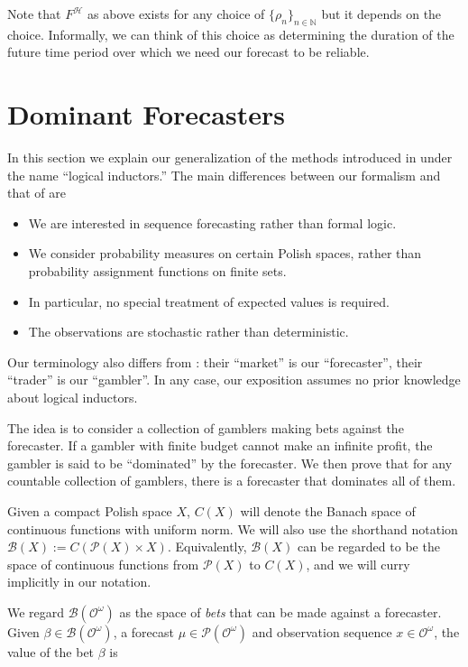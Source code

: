 \documentclass[11pt]{article}
\theoremstyle{definition}
\theoremstyle{plain}
\newcommand{\Nats}{\mathbb{N}}
\newcommand{\Sq}[2]{\{#1\}_{#2 \in \Nats}}
\newcommand{\Sqn}[1]{\Sq{#1}{n}}
\newcommand{\PM}{\mathcal{P}}
\newcommand{\Ob}{\mathcal{O}}
\newcommand{\OO}{\Ob^\omega}
\newcommand{\PMO}{\PM(\OO)}
\newcommand{\MC}{\mathcal{H}}
\newcommand{\Gm}{\mathcal{B}}
\newcommand{\GMO}{\Gm(\OO)}
\begin{document}
Note that $F^\MC$ as above exists for any choice of $\Sqn{\rho_n}$ but it depends on the choice. Informally, we can think of this choice as determining the duration of the future time period over which we need our forecast to be reliable.

\section{Dominant Forecasters}
\label{sec:garrabrant}

In this section we explain our generalization of the methods introduced in \cite{Garrabrant_2016} under the name \enquote{logical inductors.} The main differences between our formalism and that of \cite{Garrabrant_2016} are

\begin{itemize}
\item 
We are interested in sequence forecasting rather than formal logic.
\item
We consider probability measures on certain Polish spaces, rather than probability assignment functions on finite sets.
\item
In particular, no special treatment of expected values is required.
\item
The observations are stochastic rather than deterministic.
\end{itemize}

Our terminology also differs from \cite{Garrabrant_2016}: their \enquote{market} is our \enquote{forecaster}, their \enquote{trader} is our \enquote{gambler}. In any case, our exposition assumes no prior knowledge about logical inductors.

The idea is to consider a collection of gamblers making bets against the forecaster. If a gambler with finite budget cannot make an infinite profit, the gambler is said to be \enquote{dominated} by the forecaster. We then prove that for any countable collection of gamblers, there is a forecaster that dominates all of them.

Given a compact Polish space $X$, $C\left(X\right)$ will denote the Banach space of continuous functions with uniform norm. We will also use the shorthand notation $\Gm\left(X\right):=C\left(\PM\left(X\right) \times X\right)$. Equivalently, $\Gm\left(X\right)$ can be regarded to be the space of continuous functions from $\PM\left(X\right)$ to $C\left(X\right)$, and we will curry implicitly in our notation.

We regard $\GMO$ as the space of \emph{bets} that can be made against a forecaster. Given $\beta \in \GMO$, a forecast $\mu \in \PMO$ and observation sequence $x \in \OO$, the value of the bet $\beta$ is
\end{document}
